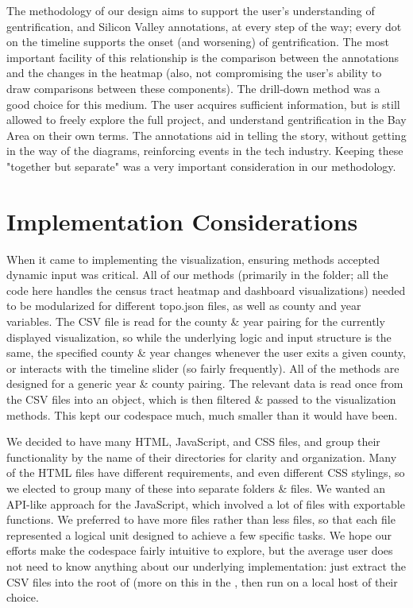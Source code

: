 \documentclass{article}
\begin{document}
    The methodology of our design aims to support the user's understanding of gentrification, and Silicon Valley annotations, at every step of the way; every dot on the timeline supports the onset (and worsening) of gentrification. The most important facility of this relationship is the comparison between the annotations and the changes in the heatmap (also, not compromising the user's ability to draw comparisons between these components). The drill-down method was a good choice for this medium. The user acquires sufficient information, but is still allowed to freely explore the full project, and understand gentrification in the Bay Area on their own terms. The annotations aid in telling the story, without getting in the way of the diagrams, reinforcing events in the tech industry. Keeping these "together but separate" was a very important consideration in our methodology.
    
\section{Implementation Considerations} \label{impl}

    When it came to implementing the visualization, ensuring methods accepted dynamic input was critical. All of our methods (primarily in the  folder; all the code here handles the census tract heatmap and dashboard visualizations) needed to be modularized for different topo.json files, as well as county and year variables. The CSV file is read for the county \& year pairing for the currently displayed visualization, so while the underlying logic and input structure is the same, the specified county \& year changes whenever the user exits a given county, or interacts with the timeline slider (so fairly frequently). All of the methods are designed for a generic year \& county pairing. The relevant data is read once from the CSV files into an object, which is then filtered \& passed to the visualization methods. This kept our codespace much, much smaller than it would have been.
    
    We decided to have many HTML, JavaScript, and CSS files, and group their functionality by the name of their directories for clarity and organization. Many of the HTML files have different requirements, and even different CSS stylings, so we elected to group many of these into separate folders \& files. We wanted an API-like approach for the JavaScript, which involved a lot of files with exportable functions. We preferred to have more files rather than less files, so that each file represented a logical unit designed to achieve a few specific tasks. We hope our efforts make the codespace fairly intuitive to explore, but the average user does not need to know anything about our underlying implementation: just extract the CSV files into the root of  (more on this in the , then run  on a local host of their choice. 
    
\end{document}
